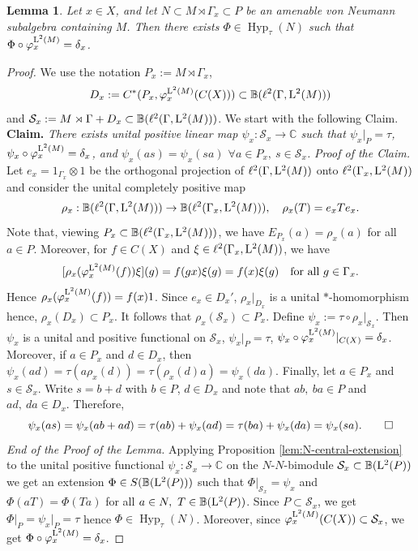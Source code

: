 \documentclass[12pt]{amsart} %
\theoremstyle{plain}
\newtheorem{lemma}[theorem]{Lemma}
\theoremstyle{definition}
\newcommand{\C}{\mathbb{C}}
\newcommand{\Lcal}{\mathbb{B}}
\newcommand{\ot}{\otimes}
\begin{document}
\begin{lemma}\label{lem:pointed-hypertrace}
Let \(x\in X\), and let $N\subset M\rtimes\Gamma_x\subset P$ be an amenable von Neumann subalgebra containing $M$. Then there exists $\Phi\in\operatorname{Hyp}_\tau(N)$
such that $\Phi\circ\varphi_x^{{\rm L}^2(M)}=\delta_x$.
\end{lemma}
\begin{proof}
We use the notation $P_x:=M\rtimes\Gamma_x$,
$$D_x:=C^*(P_x,\varphi_x^{{\rm L}^2(M)}(C(X)))\subset\Lcal(\ell^2(\Gamma,{\rm L}^2(M)))$$
and $\mathcal S_x:=M\rtimes\Gamma+D_x\subset \mathbb B(\ell^2(\Gamma,{\rm L}^2(M)))$. We start with the following Claim.
\medskip
\noindent\textbf{Claim.} \textit{There exists unital positive linear map $\psi_x:\mathcal{S}_x\to\C$ such that  $\psi_x|_{P}=\tau$, $\psi_x\circ\varphi_x^{{\rm L}^2(M)}=\delta_x$, and $\psi_x(as)=\psi_x(sa)$ $\forall a\in P_x,\ s\in\mathcal S_x$.}
\medskip
\noindent\textit{Proof of the Claim.} 
Let \(e_x=1_{\Gamma_x}\ot 1\) be the orthogonal projection of
\(\ell^2(\Gamma,{\rm L}^2(M))\) onto \(\ell^2(\Gamma_x,{\rm L}^2(M))\) and consider the unital completely positive map
$$\rho_x:\Lcal(\ell^2(\Gamma,{\rm L}^2(M)))\to\Lcal(\ell^2(\Gamma_x,{\rm L}^2(M))),\quad\rho_x(T)=e_xTe_x.$$
Note that, viewing $P_x\subset \Lcal(\ell^2(\Gamma_x,{\rm L}^2(M)))$, we have $E_{P_x}(a)=\rho_x(a)$ for all $a\in P$. Moreover, for \(f\in C(X)\) and $\xi\in\ell^2(\Gamma_x,{\rm L}^2(M))$, we have
$$
        [\rho_x(\varphi^{{\rm L}^2(M)}_x(f))\xi](g)
        =
        f(gx)\xi(g)
        =
        f(x)\xi(g)\quad\text{for all }g\in\Gamma_x.
$$
Hence $\rho_x(\varphi^{{\rm L}^2(M)}_x(f))=f(x)1$. Since  \(e_x\in D_x'\), $\rho_x\vert_{D_x}$ is a unital $*$-homomorphism hence, $\rho_x(D_x)\subset P_x$. It follows that $\rho_x(\mathcal{S}_x)\subset P_x$. Define $\psi_x:=\tau\circ\rho_x\vert_{\mathcal{S}_x}$. Then $\psi_x$ is a unital and positive functional on $\mathcal{S}_x$, $\psi_x|_{P}=\tau$, $\psi_x\circ\varphi^{{\rm L}^2(M)}_x|_{C(X)}=\delta_x$. Moreover, if \(a\in P_x\) and \(d\in D_x\), then $\psi_x(ad) =\tau(a\rho_x(d))=\tau(\rho_x(d)a)=\psi_x(da)$. Finally, let \(a\in P_x\) and \(s\in\mathcal S_x\). Write $s=b+d$ with $b\in P$, $d\in D_x$ and note that $ab,\ ba\in P$ and $ad,\ da\in D_x$. Therefore,
$$\psi_x(as)=\psi_x(ab+ad)=\tau(ab)+\psi_x(ad)=\tau(ba)+\psi_x(da)=\psi_x(sa).\hfill\qed$$
\noindent\textit{End of the Proof of the Lemma.} Applying Proposition \ref{lem:N-central-extension} to the unital positive functional $\psi_x:\mathcal{S}_x\to\C$ on the $N$-$N$-bimodule $\mathcal{S}_x\subset\Lcal({\rm L}^2(P))$ we get an extension $\Phi\in S(\mathbb{B}({\rm L}^2(P)))$ such that $\Phi|_{\mathcal S_x}=\psi_x$ and $\Phi(aT)=\Phi(Ta)$ for all $a\in N,\ T\in\mathbb B({\rm L}^2(P))$. Since \(P\subset\mathcal S_x\), we get $\Phi|_P=\psi_x\vert_P=\tau$ hence $\Phi\in\operatorname{Hyp}_\tau(N)$. Moreover, since $\varphi_x^{{\rm L}^2(M)}(C(X))\subset\mathcal S_x$, we get $\Phi\circ\varphi_x^{{\rm L}^2(M)}=\delta_x$.\end{proof}
\end{document}
